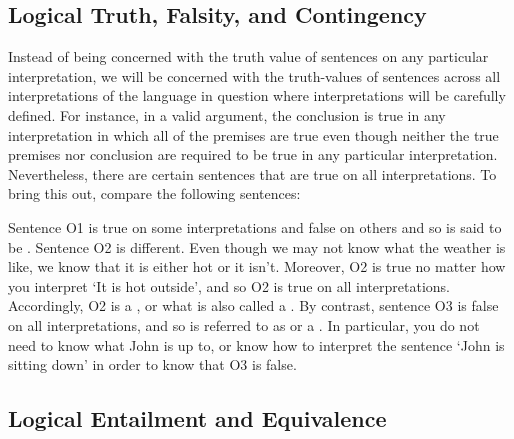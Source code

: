 \subsection{Logical Truth, Falsity, and Contingency}
\label{sec-tautologydef}

Instead of being concerned with the truth value of sentences on any particular interpretation, we will be concerned with the truth-values of sentences across all interpretations of the language in question where interpretations will be carefully defined.
For instance, in a valid argument, the conclusion is true in any interpretation in which all of the premises are true even though neither the true premises nor conclusion are required to be true in any particular interpretation.
Nevertheless, there are certain sentences that are true on all interpretations.
To bring this out, compare the following sentences:

\begin{earg}
\end{earg}

Sentence O1 is true on some interpretations and false on others and so is said to be .
Sentence O2 is different.
Even though we may not know what the weather is like, we know that it is either hot or it isn't.
Moreover, O2 is true no matter how you interpret `It is hot outside', and so O2 is true on all interpretations.
Accordingly, O2 is a , or what is also called a .
By contrast, sentence O3 is false on all interpretations, and so is referred to as  or a .
In particular, you do not need to know what John is up to, or know how to interpret the sentence `John is sitting down' in order to know that O3 is false.



\subsection{Logical Entailment and Equivalence}

